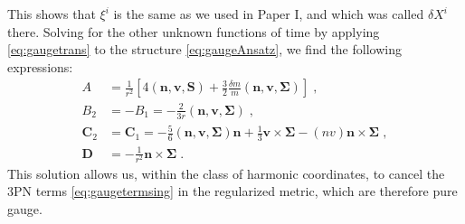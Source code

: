 \documentclass[
superscriptaddress,
preprint,
prd,tightenlines,showpacs,nofootinbib,
eqsecnum,
amsfonts,amsmath,amssymb]{revtex4-1}
\begin{document}
This shows that $\xi^{i}$ is the same as we used in Paper I, and which
was called $\delta X^{i}$ there. Solving for the other unknown
functions of time by applying \eqref{eq:gaugetrans} to the structure
\eqref{eq:gaugeAnsatz}, we find the following expressions:
\begin{subequations}
  \begin{align} \label{eq:gaugeres}
    A &= \frac{1}{r^{2}} \left[ 4 (\mathbf{n},\mathbf{v},\mathbf{S}) + \frac{3}{2} \frac{\delta m}{m} (\mathbf{n},\mathbf{v},\mathbf{\Sigma}) \right] \; , \\
    B_{2} &= - B_{1} = -\frac{2}{3 r} (\mathbf{n},\mathbf{v},\mathbf{\Sigma}) \; , \\
    \mathbf{C}_{2} &= \mathbf{C}_{1} = -\frac{5}{6} (\mathbf{n},\mathbf{v},\mathbf{\Sigma}) \mathbf{n} + \frac{1}{3} \mathbf{v}\times\mathbf{\Sigma} - (nv) \mathbf{n}\times\mathbf{\Sigma} \; , \\
    \mathbf{D} &= -\frac{1}{r^{2}} \mathbf{n}\times\mathbf{\Sigma} \;
    .
\end{align}
\end{subequations}
This solution allows us, within the class of harmonic coordinates, to
cancel the 3PN terms \eqref{eq:gaugetermsing} in the regularized
metric, which are therefore pure gauge.

%
  
\end{document}
